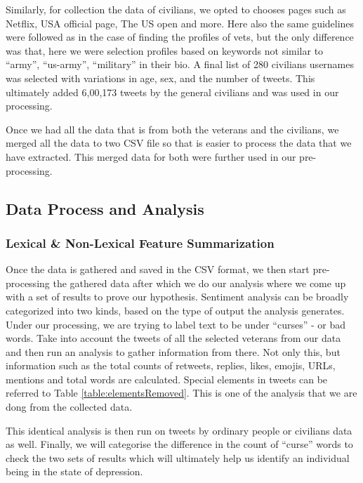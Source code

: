 Similarly, for collection the data of civilians, we opted to chooses pages such as Netflix, USA official page, The US open and more. Here also the same guidelines were followed as in the case of finding the profiles of vets, but the only difference was that, here we were selection profiles based on keywords not similar to “army”, “us-army”, “military” in their bio. A final list of 280 civilians usernames was selected with variations in age, sex, and the number of tweets. This ultimately added 6,00,173 tweets by the general civilians and was used in our processing.

Once we had all the data that is from both the veterans and the civilians, we merged all the data to two CSV file so that is easier to process the data that we have extracted. This merged data for both were further used in our pre-processing.

\subsection{Data Process and Analysis}

\subsubsection{Lexical \& Non-Lexical Feature Summarization}

Once the data is gathered and saved in the CSV format, we then start pre-processing the gathered data after which we do our analysis where we come up with a set of results to prove our hypothesis. Sentiment analysis can be broadly categorized into two kinds, based on the type of output the analysis generates. Under our processing, we are trying to label text to be under \enquote{curses} - or bad words. Take into account the tweets of all the selected veterans from our data and then run an analysis to gather information from there. Not only this, but information such as the total counts of retweets, replies, likes, emojis, URLs, mentions and total words are calculated. Special elements in tweets can be referred to Table \ref{table:elementsRemoved}. This is one of the analysis that we are dong from the collected data.

This identical analysis is then run on tweets by ordinary people or civilians data as well. Finally, we will categorise the difference in the count of \enquote{curse} words to check the two sets of results which will ultimately help us identify an individual being in the state of depression.

